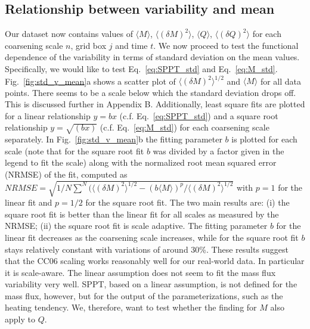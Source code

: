 \documentclass[a4paper, 12pt]{article}
\begin{document}
\subsection{Relationship between variability and mean}
Our dataset now contains values of $\langle M \rangle$, $\langle (\delta M )^2 \rangle$, $\langle Q \rangle$, $\langle (\delta Q )^2 \rangle$ for each coarsening scale $n$, grid box $j$ and time $t$. We now proceed to test the functional dependence of the variability in terms of standard deviation on the mean values. Specifically, we would like to test Eq.~\ref{eq:SPPT_std} and Eq.~\ref{eq:M_std}. Fig.~\ref{fig:std_v_mean}a shows a scatter plot of $\langle (\delta M )^2 \rangle^{1/2}$ and $\langle M \rangle$ for all data points. There seems to be a scale below which the standard deviation drops off. This is discussed further in Appendix B. Additionally, least square fits are plotted for a linear relationship $y = bx$ (c.f. Eq.~\ref{eq:SPPT_std}) and a square root relationship $y = \sqrt{(bx)}$ (c.f. Eq.~\ref{eq:M_std}) for each coarsening scale separately. In Fig.~\ref{fig:std_v_mean}b the fitting parameter $b$ is plotted for each scale (note that for the square root fit $b$ was divided by a factor given in the legend to fit the scale) along with the normalized root mean squared error (NRMSE) of the fit, computed as $NRMSE = \sqrt{1/N \sum^N (\langle (\delta M )^2 \rangle^{1/2} - (b\langle M \rangle)^p/\langle (\delta M )^2 \rangle^{1/2}}$ with $p=1$ for the linear fit and $p=1/2$ for the square root fit. The two main results are: (i) the square root fit is better than the linear fit for all scales as measured by the NRMSE; (ii) the square root fit is scale adaptive. The fitting parameter $b$ for the linear fit decreases as the coarsening scale increases, while for the square root fit $b$ stays relatively constant with variations of around 30\%. These results suggest that the CC06 scaling works reasonably well for our real-world data. In particular it is scale-aware. The linear assumption does not seem to fit the mass flux variability very well. SPPT, based on a linear assumption, is not defined for the mass flux, however, but for the output of the parameterizations, such as the heating tendency. We, therefore, want to test whether the finding for $M$ also apply to $Q$.
\end{document}

